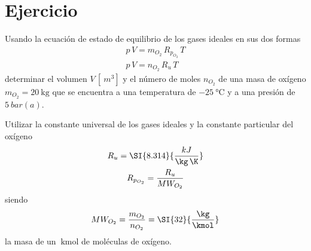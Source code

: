 \section{Ejercicio}\label{ej:Chap03Ejercicio01}

Usando la ecuación de estado de equilibrio de los gases ideales en sus dos formas
\begin{gather}
    p\,V = m_{O_2}\,R_{p_{O_2}}\,T\\
    p\,V = n_{O_2}\,R_u\,T
\end{gather}
determinar el volumen $V\,[\SI{}{m^3}]$ y el número de moles $n_{O_2}$ de una masa de oxígeno $m_{O_2}=\SI{20}{\kg}$ que se encuentra a una temperatura de $\SI{-25}{\celsius}$ y a una presión de $\SI{5}{bar(a)}$.

Utilizar la constante universal de los gases ideales y la constante particular del oxígeno
\begin{gather}
    R_u=\SI{8.314}{\frac{kJ}{\kg\,\K}}\\
    R_{p_{O_2}} = \frac{R_u}{MW_{O_2}}
\end{gather}
siendo 
\begin{equation}
    MW_{O_2}=\frac{m_{O_2}}{n_{O_2}}=\SI{32}{\frac{\kg}{\kmol}}
\end{equation}
la masa de un $\SI{}{\kmol}$ de moléculas de oxígeno.
